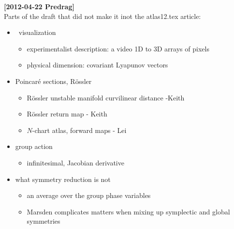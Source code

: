 \noindent
{\bf [2012-04-22 Predrag]}
\\
Parts of the draft that did not make it inot the atlas12.tex article:

\begin{itemize}
  \item \statesp\ visualization
    \begin{itemize}
      \item experimentalist description: a video 1D to 3D arrays of pixels
      \item physical dimension: covariant Lyapunov vectors
    \end{itemize}
  \item Poincar\'e sections, R\"ossler
    \begin{itemize}
      \item R\"ossler unstable manifold curvilinear distance -Keith
      \item R\"ossler return map - Keith
      \item $N$-chart atlas, forward maps - Lei
    \end{itemize}
  \item group action
    \begin{itemize}
      \item infinitesimal, Jacobian derivative
    \end{itemize}
  \item what symmetry reduction is not
    \begin{itemize}
      \item an average over the group phase variables
      \item Marsden complicates matters when mixing up symplectic and
            global symmetries
    \end{itemize}
\end{itemize}

